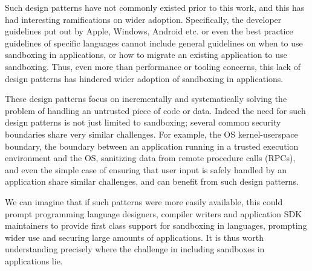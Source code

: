 Such design patterns have not commonly existed prior to this work, and this has 
had interesting ramifications on wider adoption.
%
Specifically, the developer guidelines put out by Apple, Windows, Android etc. 
or even the best practice guidelines of specific languages cannot include 
general guidelines on when to use sandboxing in applications, or how to migrate 
an existing application to use sandboxing.
%
Thus, even more than performance or tooling concerns, this lack of design 
patterns has hindered wider adoption of sandboxing in applications.

These design patterns focus on incrementally and systematically solving the 
problem of handling an untrusted piece of code or data.
%
Indeed the need for such design patterns is not just limited to sandboxing; 
several common security boundaries share very similar challenges. 
%
For example, the OS kernel-userspace boundary, the boundary between an 
application running in a trusted execution environment and the OS, sanitizing 
data from remote procedure calls (RPCs), and even the simple case of ensuring 
that user input is safely handled by an application share similar challenges, 
and can benefit from such design patterns.

We can imagine that if such patterns were more easily available, this could 
prompt programming language designers, compiler writers and application SDK 
maintainers to provide first class support for sandboxing in languages, 
prompting wider use and securing large amounts of applications.
%
It is thus worth understanding precisely where the challenge in including 
sandboxes in applications lie.

